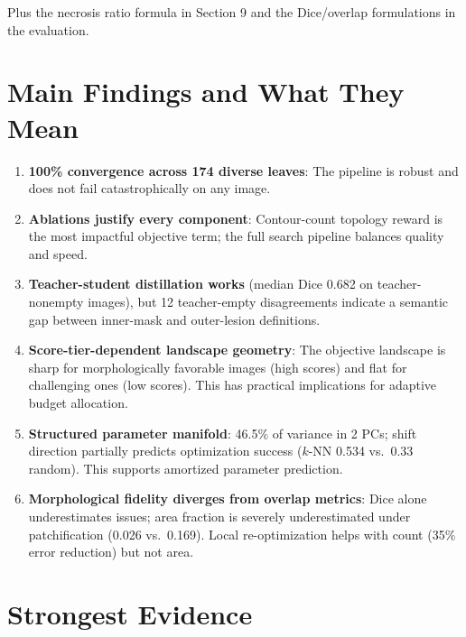 \documentclass[11pt,a4paper]{article}
\begin{document}
Plus the necrosis ratio formula in Section 9 and the Dice/overlap formulations in the evaluation.

\section{Main Findings and What They Mean}

\begin{enumerate}
  \item \textbf{100\% convergence across 174 diverse leaves}: The pipeline is robust and does not fail catastrophically on any image.

  \item \textbf{Ablations justify every component}: Contour-count topology reward is the most impactful objective term; the full search pipeline balances quality and speed.

  \item \textbf{Teacher-student distillation works} (median Dice 0.682 on teacher-nonempty images), but 12 teacher-empty disagreements indicate a semantic gap between inner-mask and outer-lesion definitions.

  \item \textbf{Score-tier-dependent landscape geometry}: The objective landscape is sharp for morphologically favorable images (high scores) and flat for challenging ones (low scores).  This has practical implications for adaptive budget allocation.

  \item \textbf{Structured parameter manifold}: 46.5\% of variance in 2 PCs; shift direction partially predicts optimization success ($k$-NN 0.534 vs.\ 0.33 random).  This supports amortized parameter prediction.

  \item \textbf{Morphological fidelity diverges from overlap metrics}: Dice alone underestimates issues; area fraction is severely underestimated under patchification (0.026 vs.\ 0.169).  Local re-optimization helps with count (35\% error reduction) but not area.
\end{enumerate}

\section{Strongest Evidence}
\end{document}

